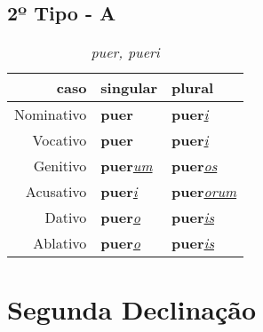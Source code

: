 \documentclass{article}
\newcommand{\radicaldesinencia}[2]{\textbf{#1}\textit{\underline{#2}}}
\begin{document}
\subsection*{2º Tipo - A}
\begin{table}[H]
\centering
\caption*{\textit{puer, pueri}}
\vspace{0.2cm}
\begin{tabular}{r|l|l}
\hline
caso			&	singular					& plural 								\\
\hline                                    		
\hline
Nominativo	&	\radicaldesinencia{puer}{}		& \radicaldesinencia{puer}{i}			\\
Vocativo		&	\radicaldesinencia{puer}{}		& \radicaldesinencia{puer}{i}			\\
Genitivo		&	\radicaldesinencia{puer}{um}	& \radicaldesinencia{puer}{os}		\\
Acusativo	&	\radicaldesinencia{puer}{i}		& \radicaldesinencia{puer}{orum}	\\
Dativo		&	\radicaldesinencia{puer}{o}		& \radicaldesinencia{puer}{is}		\\
Ablativo		&	\radicaldesinencia{puer}{o}		& \radicaldesinencia{puer}{is}		\\


 \hline
\end{tabular}
\end{table}
\clearpage





\section*{Segunda Declinação}
\end{document}
